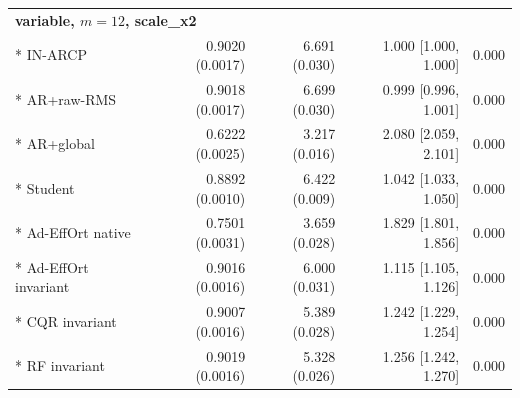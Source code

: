 \begin{longtable}{lrrrr}
\midrule
\multicolumn{5}{l}{\textbf{variable, $m=12$, scale\_x2}}\\*
IN-ARCP & 0.9020 (0.0017) & 6.691 (0.030) & 1.000 [1.000, 1.000] & 0.000 \\*
AR+raw-RMS & 0.9018 (0.0017) & 6.699 (0.030) & 0.999 [0.996, 1.001] & 0.000 \\*
AR+global & 0.6222 (0.0025) & 3.217 (0.016) & 2.080 [2.059, 2.101] & 0.000 \\*
Student & 0.8892 (0.0010) & 6.422 (0.009) & 1.042 [1.033, 1.050] & 0.000 \\*
Ad-EffOrt native & 0.7501 (0.0031) & 3.659 (0.028) & 1.829 [1.801, 1.856] & 0.000 \\*
Ad-EffOrt invariant & 0.9016 (0.0016) & 6.000 (0.031) & 1.115 [1.105, 1.126] & 0.000 \\*
CQR invariant & 0.9007 (0.0016) & 5.389 (0.028) & 1.242 [1.229, 1.254] & 0.000 \\*
RF invariant & 0.9019 (0.0016) & 5.328 (0.026) & 1.256 [1.242, 1.270] & 0.000 \\
\bottomrule
\end{longtable}
\normalsize
